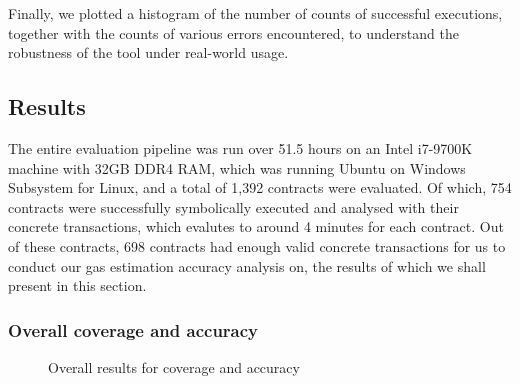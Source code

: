 Finally, we plotted a histogram of the number of counts of successful executions, together with 
the counts of various errors encountered, to understand the robustness of the tool under real-world
usage.

\subsection{Results}

The entire evaluation pipeline was run over 51.5 hours on an Intel i7-9700K machine with 32GB DDR4 RAM, 
which was running Ubuntu on Windows Subsystem for Linux, and a total of 1,392 contracts were evaluated.
Of which, 754 contracts were successfully symbolically executed and analysed with their concrete transactions, 
which evalutes to around 4 minutes for each contract. Out of these contracts, 
698 contracts had enough valid concrete transactions for us to
conduct our gas estimation accuracy analysis on, the results of which we shall present in this section.

\subsubsection{Overall coverage and accuracy}

\begin{figure}[h]
  \centering
  \qquad
  \caption{Overall results for coverage and accuracy}%
  \label{fig:eval_overall}%
\end{figure}

